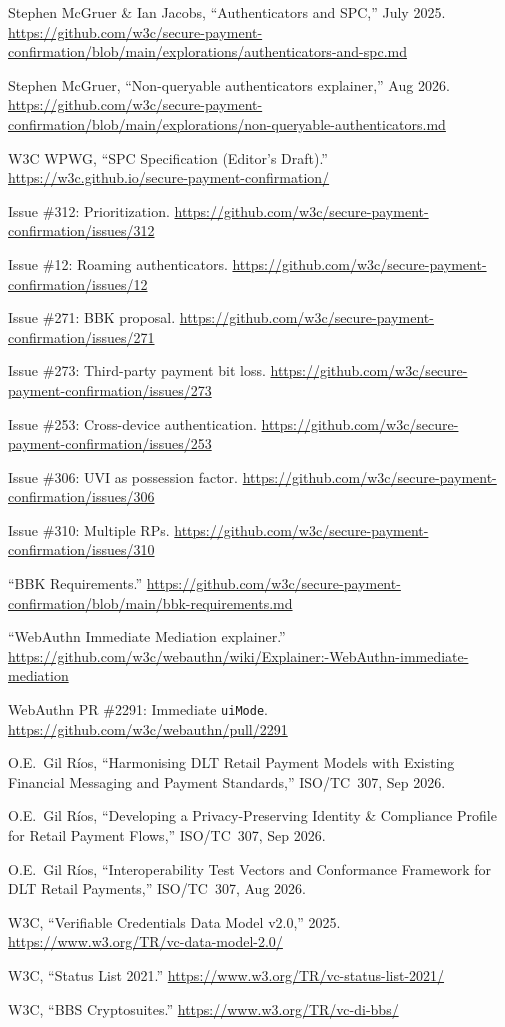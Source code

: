 \documentclass[12pt,a4paper]{article}
\begin{document}
\begin{enumerate}[label={[\arabic*]},noitemsep,topsep=4pt]
  \item Stephen McGruer \& Ian Jacobs, ``Authenticators and SPC,'' July 2025. \url{https://github.com/w3c/secure-payment-confirmation/blob/main/explorations/authenticators-and-spc.md}
  \item Stephen McGruer, ``Non-queryable authenticators explainer,'' Aug 2026. \url{https://github.com/w3c/secure-payment-confirmation/blob/main/explorations/non-queryable-authenticators.md}
  \item W3C WPWG, ``SPC Specification (Editor's Draft).'' \url{https://w3c.github.io/secure-payment-confirmation/}
  \item Issue \#312: Prioritization. \url{https://github.com/w3c/secure-payment-confirmation/issues/312}
  \item Issue \#12: Roaming authenticators. \url{https://github.com/w3c/secure-payment-confirmation/issues/12}
  \item Issue \#271: BBK proposal. \url{https://github.com/w3c/secure-payment-confirmation/issues/271}
  \item Issue \#273: Third-party payment bit loss. \url{https://github.com/w3c/secure-payment-confirmation/issues/273}
  \item Issue \#253: Cross-device authentication. \url{https://github.com/w3c/secure-payment-confirmation/issues/253}
  \item Issue \#306: UVI as possession factor. \url{https://github.com/w3c/secure-payment-confirmation/issues/306}
  \item Issue \#310: Multiple RPs. \url{https://github.com/w3c/secure-payment-confirmation/issues/310}
  \item ``BBK Requirements.'' \url{https://github.com/w3c/secure-payment-confirmation/blob/main/bbk-requirements.md}
  \item ``WebAuthn Immediate Mediation explainer.'' \url{https://github.com/w3c/webauthn/wiki/Explainer:-WebAuthn-immediate-mediation}
  \item WebAuthn PR \#2291: Immediate \texttt{uiMode}. \url{https://github.com/w3c/webauthn/pull/2291}
  \item O.E.~Gil Ríos, ``Harmonising DLT Retail Payment Models with Existing Financial Messaging and Payment Standards,'' ISO/TC~307, Sep 2026.
  \item O.E.~Gil Ríos, ``Developing a Privacy-Preserving Identity \& Compliance Profile for Retail Payment Flows,'' ISO/TC~307, Sep 2026.
  \item O.E.~Gil Ríos, ``Interoperability Test Vectors and Conformance Framework for DLT Retail Payments,'' ISO/TC~307, Aug 2026.
  \item W3C, ``Verifiable Credentials Data Model v2.0,'' 2025. \url{https://www.w3.org/TR/vc-data-model-2.0/}
  \item W3C, ``Status List 2021.'' \url{https://www.w3.org/TR/vc-status-list-2021/}
  \item W3C, ``BBS Cryptosuites.'' \url{https://www.w3.org/TR/vc-di-bbs/}
\end{enumerate}
\end{document}
